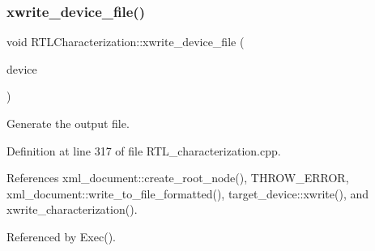 \subsubsection{\texorpdfstring{xwrite\+\_\+device\+\_\+file()}{xwrite\_device\_file()}}
{\footnotesize\ttfamily void R\+T\+L\+Characterization\+::xwrite\+\_\+device\+\_\+file (\begin{DoxyParamCaption}\item[{const \hyperlink{target__device_8hpp_acedb2b7a617e27e6354a8049fee44eda}{target\+\_\+device\+Ref}}]{device }\end{DoxyParamCaption})\hspace{0.3cm}{\ttfamily [private]}}



Generate the output file. 



Definition at line 317 of file R\+T\+L\+\_\+characterization.\+cpp.



References xml\+\_\+document\+::create\+\_\+root\+\_\+node(), T\+H\+R\+O\+W\+\_\+\+E\+R\+R\+OR, xml\+\_\+document\+::write\+\_\+to\+\_\+file\+\_\+formatted(), target\+\_\+device\+::xwrite(), and xwrite\+\_\+characterization().



Referenced by Exec().

